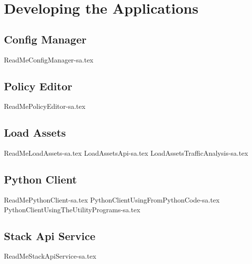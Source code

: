 
\chapter{Developing the Applications}
\label{intro05} %


\section{Config Manager}
{ReadMeConfigManager-sa.tex}

\section{Policy Editor}
{ReadMePolicyEditor-sa.tex}

\section{Load Assets}
{ReadMeLoadAssets-sa.tex}
{LoadAssetsApi-sa.tex}
{LoadAssetsTrafficAnalysis-sa.tex}

\section{Python Client}
{ReadMePythonClient-sa.tex}
{PythonClientUsingFromPythonCode-sa.tex}
{PythonClientUsingTheUtilityPrograms-sa.tex}

\section{Stack Api Service}
{ReadMeStackApiService-sa.tex}

